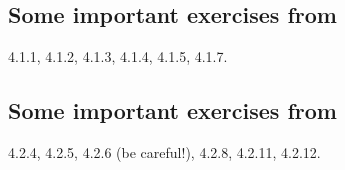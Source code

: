 \subsection{Some important exercises from~\cite[\S4.1.3]{VianaOliveiraFoundErgTh}}
\label{sec:some-import-exerc-4.1.3}

4.1.1, 4.1.2, 4.1.3, 4.1.4, 4.1.5, 4.1.7.

\subsection{Some important exercises from~\cite[\S4.2.7]{VianaOliveiraFoundErgTh}}
\label{sec:some-import-exerc-4.2.7}

4.2.4, 4.2.5, 4.2.6 (be careful!), 4.2.8, 4.2.11, 4.2.12.
